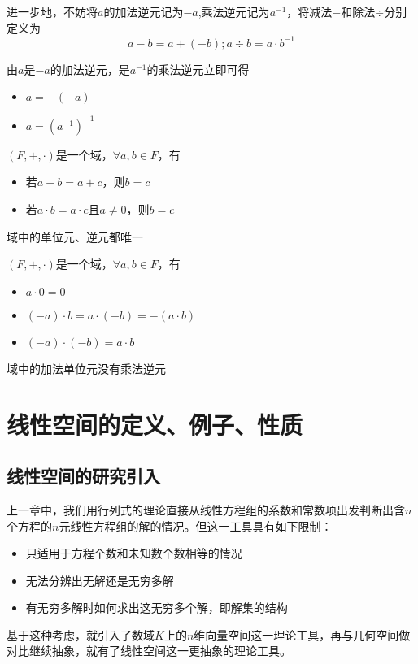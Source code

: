 进一步地，不妨将$a$的加法逆元记为$-a$,乘法逆元记为$a^{-1}$，将减法$-$和除法$\div$分别定义为
\[a-b=a+(-b);a \div b = a \cdot b^{-1}\]
\begin{theorem}
    由$a$是$-a$的加法逆元，是$a^{-1}$的乘法逆元立即可得
    \begin{itemize}
        \item $a=-(-a)$
        \item $a=(a^{-1})^{-1}$
    \end{itemize}
\end{theorem}
\begin{theorem}[消去律]
    $(F,+,\cdot)$是一个域，$\forall a,b \in F$，有
    \begin{itemize}
        \item 若$a+b=a+c$，则$b=c$
        \item 若$a \cdot b=a \cdot c$且$a \neq 0$，则$b=c$
    \end{itemize}
\end{theorem}
\begin{corollary}
    域中的单位元、逆元都唯一
\end{corollary}
\begin{theorem}
    $(F,+,\cdot)$是一个域，$\forall a,b \in F$，有
    \begin{itemize}
        \item $a \cdot 0 = 0$
        \item $(-a) \cdot b = a \cdot (-b) = -(a \cdot b)$
        \item $(-a) \cdot (-b) = a \cdot b$
    \end{itemize}
\end{theorem}
\begin{corollary}
    域中的加法单位元没有乘法逆元
\end{corollary}

\section{线性空间的定义、例子、性质}
\subsection{线性空间的研究引入}
上一章中，我们用行列式的理论直接从线性方程组的系数和常数项出发判断出含$n$个方程的$n$元线性方程组的解的情况。但这一工具具有如下限制：
\begin{itemize}
    \item 只适用于方程个数和未知数个数相等的情况
    \item 无法分辨出无解还是无穷多解
    \item 有无穷多解时如何求出这无穷多个解，即解集的结构
\end{itemize}
基于这种考虑，就引入了数域$K$上的$n$维向量空间这一理论工具，再与几何空间做对比继续抽象，就有了线性空间这一更抽象的理论工具。

